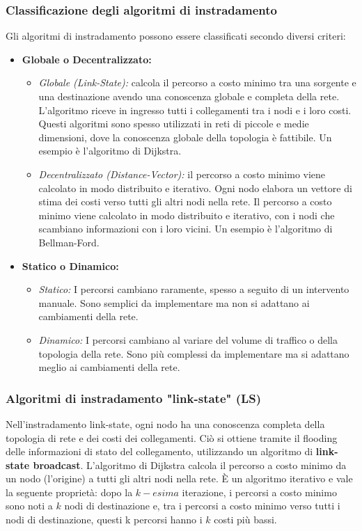 \subsubsection*{Classificazione degli algoritmi di instradamento}
Gli algoritmi di instradamento possono essere classificati secondo diversi criteri:
\begin{itemize}
    \item \textbf{Globale o Decentralizzato:}
        \begin{itemize}
            \item \textit{Globale (Link-State):} calcola il percorso a costo minimo tra una sorgente e una destinazione avendo una conoscenza globale e completa della rete. L'algoritmo riceve in ingresso tutti i collegamenti tra i nodi e i loro costi. Questi algoritmi sono spesso utilizzati in reti di piccole e medie dimensioni, dove la conoscenza globale della topologia è fattibile. Un esempio è l'algoritmo di Dijkstra.
            \item \textit{Decentralizzato (Distance-Vector):} il percorso a costo minimo viene calcolato in modo distribuito e iterativo. Ogni nodo elabora un vettore di stima dei costi verso tutti gli altri nodi nella rete. Il percorso a costo minimo viene calcolato in modo distribuito e iterativo, con i nodi che scambiano informazioni con i loro vicini. Un esempio è l'algoritmo di Bellman-Ford.
        \end{itemize}
    \item \textbf{Statico o Dinamico:}
        \begin{itemize}
            \item \textit{Statico:} I percorsi cambiano raramente, spesso a seguito di un intervento manuale. Sono semplici da implementare ma non si adattano ai cambiamenti della rete.
            \item \textit{Dinamico:} I percorsi cambiano al variare del volume di traffico o della topologia della rete. Sono più complessi da implementare ma si adattano meglio ai cambiamenti della rete.
        \end{itemize}
\end{itemize}

\subsubsection{Algoritmi di instradamento "link-state" (LS)}
Nell'instradamento link-state, ogni nodo ha una conoscenza completa della topologia di rete e dei costi dei collegamenti. 
Ciò si ottiene tramite il flooding delle informazioni di stato del collegamento, utilizzando un algoritmo di \textbf{link-state broadcast}. 
L'algoritmo di Dijkstra calcola il percorso a costo minimo da un nodo (l'origine) a tutti gli altri nodi nella rete. È un algoritmo iterativo e vale la seguente proprietà:
dopo la $k-esima$ iterazione, i percorsi a costo minimo sono noti a $k$ nodi di destinazione e, tra i percorsi a costo minimo verso tutti i nodi di destinazione, questi k percorsi hanno i $k$ costi più bassi. 

